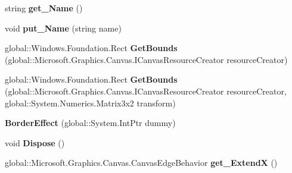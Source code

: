 \begin{DoxyCompactItemize}
\item 
\mbox{\label{class_microsoft_1_1_graphics_1_1_canvas_1_1_effects_1_1_border_effect_a06b4e0b6be004484d2969b9d38ddf0ea}} 
string {\bfseries get\+\_\+\+Name} ()
\item 
\mbox{\label{class_microsoft_1_1_graphics_1_1_canvas_1_1_effects_1_1_border_effect_a9687a3b0cb7b3111d9e92a7d17c30256}} 
void {\bfseries put\+\_\+\+Name} (string name)
\item 
\mbox{\label{class_microsoft_1_1_graphics_1_1_canvas_1_1_effects_1_1_border_effect_ad8bd48d4828136c863ab7e2088fc2448}} 
global\+::\+Windows.\+Foundation.\+Rect {\bfseries Get\+Bounds} (global\+::\+Microsoft.\+Graphics.\+Canvas.\+I\+Canvas\+Resource\+Creator resource\+Creator)
\item 
\mbox{\label{class_microsoft_1_1_graphics_1_1_canvas_1_1_effects_1_1_border_effect_a71d105763b501f2e7bcdb69338ce699c}} 
global\+::\+Windows.\+Foundation.\+Rect {\bfseries Get\+Bounds} (global\+::\+Microsoft.\+Graphics.\+Canvas.\+I\+Canvas\+Resource\+Creator resource\+Creator, global\+::\+System.\+Numerics.\+Matrix3x2 transform)
\item 
\mbox{\label{class_microsoft_1_1_graphics_1_1_canvas_1_1_effects_1_1_border_effect_a2047b145d942967ddaf531f628fd6457}} 
{\bfseries Border\+Effect} (global\+::\+System.\+Int\+Ptr dummy)
\item 
\mbox{\label{class_microsoft_1_1_graphics_1_1_canvas_1_1_effects_1_1_border_effect_a8395460dd5965cd4aacc0875a1c0b680}} 
void {\bfseries Dispose} ()
\item 
\mbox{\label{class_microsoft_1_1_graphics_1_1_canvas_1_1_effects_1_1_border_effect_a9b8cb2410a4d2443829d9eeecfd0733e}} 
global\+::\+Microsoft.\+Graphics.\+Canvas.\+Canvas\+Edge\+Behavior {\bfseries get\+\_\+\+ExtendX} ()

\end{DoxyCompactItemize}
